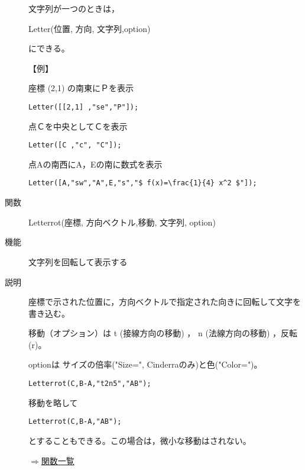 \documentclass[papersize,a4paper,10pt,uplatex]{jsarticle}
\begin{document}
\begin{description}
文字列が一つのときは，

Letter(位置, 方向, 文字列,option)

にできる。

\vspace{\baselineskip}
【例】

座標 (2,1) の南東にＰを表示

\hspace{10mm}\verb|Letter([[2,1] ,"se","P"]);|

点Ｃを中央としてＣを表示

\hspace{10mm}\verb|Letter([C ,"c", "C"]);|

点Aの南西にA，Eの南に数式を表示

\hspace{10mm}\verb|Letter([A,"sw","A",E,"s","$ f(x)=\frac{1}{4} x^2 $"]);| 

\vspace{\baselineskip}
\hypertarget{letterrot}{}\item[関数]Letterrot(座標, 方向ベクトル,移動, 文字列, option)
\item[機能]文字列を回転して表示する
\item[説明]座標で示された位置に，方向ベクトルで指定された向きに回転して文字を書き込む。

移動（オプション）は t (接線方向の移動) ， n (法線方向の移動) ，反転 (r)。

optionは サイズの倍率("Size=", Cinderraのみ)と色("Color=")。

\begin{verbatim}
Letterrot(C,B-A,"t2n5","AB");
\end{verbatim}

移動を略して

\hspace{10mm}\verb|Letterrot(C,B-A,"AB");|

とすることもできる。この場合は，微小な移動はされない。

\begin{flushright}\hyperlink{functionlist}{$\Rightarrow$関数一覧}\end{flushright}

\end{description}
\end{document}
